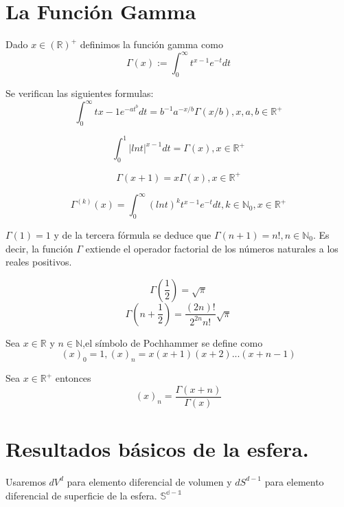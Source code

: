 \chapter{La Función Gamma}\label{aped.A}
\begin{defn} Dado $x\in\mathds{(R)^+}$ definimos la función gamma como
	$$
	\Gamma(x) := \int_{0}^{\infty} t^{x-1}e^{-t}dt		
	$$
\end{defn}
\begin{prop}Se verifican las siguientes formulas:
	$$
	\int_{0}^{\infty}  t{x-1}e^{-at^b}dt = b^{-1}a^{-x/b}\Gamma(x/b)  , x,a,b \in \mathds{R}^+
	$$
	
	$$
	\int_{0}^{1} |ln t|^{x-1}dt = \Gamma(x),   x \in \mathds{R}^+
	$$
	
	$$
	\Gamma(x+1) = x \Gamma(x) ,		x\in \mathds{R}^+
	$$
	
	$$
	\Gamma^{(k)}(x) = \int_{0}^{\infty} (ln t)^k t^{x-1} e^{-t} dt,   k\in\mathds{N}_0,x\in\mathds{R}^+
	$$
\end{prop}
\begin{rem}
	$\Gamma(1)=1$ y de la tercera fórmula se deduce que $\Gamma(n+1)=n!, n\in\mathds{N}_0$. Es decir, la función $\Gamma$ extiende el operador factorial de los números naturales a los reales positivos.
\end{rem}
\begin{lem} 
	$$
	\Gamma(\frac{1}{2}) = 	\sqrt{\pi}
	$$
	$$
	\Gamma(n+\frac{1}{2})=\frac{(2n)!}{2^{2n}n!} \sqrt{\pi}
	$$
\end{lem}
\begin{defn}Sea $x\in\mathds{R}$ y $n\in\mathds{N}$,el símbolo de Pochhammer se define como
	$$
	(x)_0 = 1, (x)_n=x(x+1)(x+2)...(x+n-1)
	$$
\end{defn}
\begin{prop} Sea $x\in\mathds{R}^+$ entonces
	$$
	(x)_n = \frac{\Gamma(x+n)}{\Gamma(x)}
	$$
\end{prop}
\chapter{Resultados básicos de la esfera.}\label{aped.B}
Usaremos $dV^d$ para elemento diferencial de volumen y $dS^{d-1}$ para elemento diferencial de superficie de la esfera.  $\mathds{S^{d-1}}$


